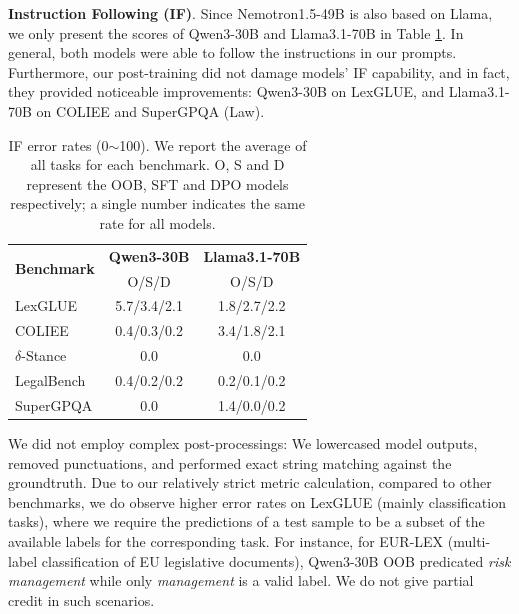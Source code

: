 \textbf{Instruction Following (IF)}. Since Nemotron1.5-49B is also based on Llama, we only present the scores of Qwen3-30B and Llama3.1-70B in Table \ref{table:if}. In general, both models were able to follow the instructions in our prompts. Furthermore, our post-training did not damage models' IF capability, and in fact, they provided noticeable improvements: Qwen3-30B on LexGLUE, and Llama3.1-70B on COLIEE and SuperGPQA (Law).
\begin{table}[ht]
  \centering
  \begin{tabular}{lcc}
    \hline
    \multirow{2}{*}{\textbf{Benchmark}} & \textbf{Qwen3-30B} & \textbf{Llama3.1-70B} \\
    & O/S/D & O/S/D \\ \hline
    LexGLUE & 5.7/3.4/2.1 & 1.8/2.7/2.2 \\
    COLIEE & 0.4/0.3/0.2 & 3.4/1.8/2.1 \\
    $\delta$-Stance & 0.0 & 0.0 \\
    LegalBench & 0.4/0.2/0.2 & 0.2/0.1/0.2 \\
    SuperGPQA & 0.0 & 1.4/0.0/0.2 \\ \hline
  \end{tabular}
  \caption{\label{table:if}
    IF error rates (0$\sim$100). We report the average of all tasks for each benchmark. O, S and D represent the OOB, SFT and DPO models respectively; a single number indicates the same rate for all models.
  }
\end{table}

We did not employ complex post-processings: We lowercased model outputs, removed punctuations, and performed exact string matching against the groundtruth. Due to our relatively strict metric calculation, compared to other benchmarks, we do observe higher error rates on LexGLUE (mainly classification tasks), where we require the predictions of a test sample to be a subset of the available labels for the corresponding task. For instance, for EUR-LEX (multi-label classification of EU legislative documents), Qwen3-30B OOB predicated \textit{risk management} while only \textit{management} is a valid label. We do not give partial credit in such scenarios.

